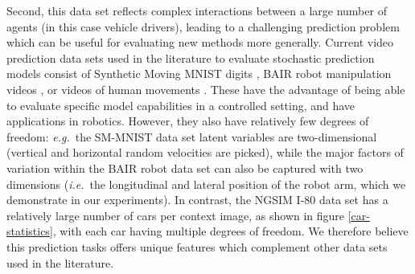 \documentclass{article}
\begin{document}
Second, this data set reflects complex interactions between a large number of agents (in this case vehicle drivers), leading to a challenging prediction problem which can be useful for evaluating new methods more generally.
Current video prediction data sets used in the literature to evaluate stochastic prediction models consist of Synthetic Moving MNIST digits \citep{Denton2018}, BAIR robot manipulation videos \citep{Ebert17}, or videos of human movements \citep{Human}.
These have the advantage of being able to evaluate specific model capabilities in a controlled setting, and have applications in robotics.
However, they also have relatively few degrees of freedom: \emph{e.g.}\ the SM-MNIST data set latent variables are two-dimensional (vertical and horizontal random velocities are picked), while the major factors of variation within the BAIR robot data set can also be captured with two dimensions (\emph{i.e.}\ the longitudinal and lateral position of the robot arm, which we demonstrate in our experiments).
In contrast, the NGSIM I-80 data set has a relatively large number of cars per context image, as shown in figure \ref{car-statistics}, with each car having multiple degrees of freedom.
We therefore believe this prediction tasks offers unique features which complement other data sets used in the literature.
\end{document}
